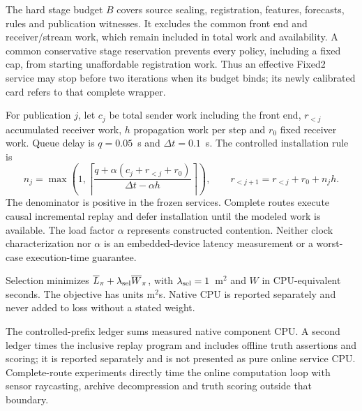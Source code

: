 The hard stage budget $B$ covers source sealing, registration, features, forecasts, rules and publication witnesses. It excludes the common front end and receiver/stream work, which remain included in total work and availability. A common conservative stage reservation prevents every policy, including a fixed cap, from starting unaffordable registration work. Thus an effective Fixed2 service may stop before two iterations when its budget binds; its newly calibrated card refers to that complete wrapper.

For publication $j$, let $c_j$ be total sender work including the front end, $r_{<j}$ accumulated receiver work, $h$ propagation work per step and $r_0$ fixed receiver work. Queue delay is $q=0.05$~s and $\Delta t=0.1$~s. The controlled installation rule is
\begin{equation}
n_j=\max\left(1,\left\lceil\frac{q+\alpha(c_j+r_{<j}+r_0)}{\Delta t-\alpha h}\right\rceil\right),\qquad
r_{<j+1}=r_{<j}+r_0+n_jh.\label{eq:delivery}
\end{equation}
The denominator is positive in the frozen services. Complete routes execute causal incremental replay and defer installation until the modeled work is available. The load factor $\alpha$ represents constructed contention. Neither clock characterization nor $\alpha$ is an embedded-device latency measurement or a worst-case execution-time guarantee.

Selection minimizes $\overline L_\pi+\lambda_{\rm sel}\overline W_\pi$, with $\lambda_{\rm sel}=1$~m$^2$ and $W$ in CPU-equivalent seconds. The objective has units m$^2$s. Native CPU is reported separately and never added to loss without a stated weight.

The controlled-prefix ledger sums measured native component CPU. A second ledger times the inclusive replay program and includes offline truth assertions and scoring; it is reported separately and is not presented as pure online service CPU. Complete-route experiments directly time the online computation loop with sensor raycasting, archive decompression and truth scoring outside that boundary.
